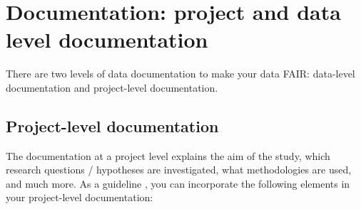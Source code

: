 \section{Documentation: project and data level documentation}
There are two levels of data documentation to make your data FAIR: data-level documentation and project-level documentation. \\
\whiteline
\subsection{Project-level documentation}
\whiteline
The documentation at a project level explains the aim of the study, which research questions / hypotheses are investigated, what methodologies are used, and much more. As a guideline \cite{CESSDA}, you can incorporate the following elements in your project-level documentation: 

